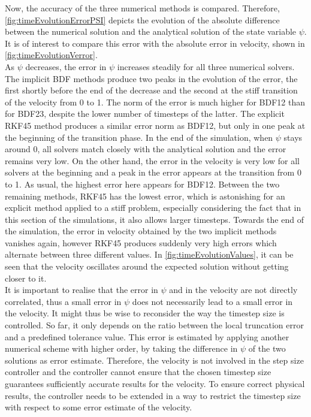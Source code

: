 \documentclass{report}
\begin{document}
Now, the accuracy of the three numerical methods is compared. Therefore, \autoref{fig:timeEvolutionErrorPSI} depicts the evolution of the absolute difference between the numerical solution and the analytical solution of the state variable $\psi$. It is of interest to compare this error with the absolute error in velocity, shown in \autoref{fig:timeEvolutionVerror}. \\ 
As $\psi$ decreases, the error in $\psi$ increases steadily for all three numerical solvers. The implicit BDF methods produce two peaks in the evolution of the error, the first shortly before the end of the decrease and the second at the stiff transition of the velocity from 0 to 1. The norm of the error is much higher for BDF12 than for BDF23, despite the lower number of timesteps of the latter. The explicit RKF45 method produces a similar error norm as BDF12, but only in one peak at the beginning of the transition phase. In the end of the simulation, when $\psi$ stays around 0, all solvers match closely with the analytical solution and the error remains very low. On the other hand, the error in the velocity is very low for all solvers at the beginning and a peak in the error appears at the transition from 0 to 1. As usual, the highest error here appears for BDF12. Between the two remaining methods, RKF45 has the lowest error, which is astonishing for an explicit method applied to a stiff problem, especially considering the fact that in this section of the simulations, it also allows larger timesteps. Towards the end of the simulation, the error in velocity obtained by the two implicit methods vanishes again, however RKF45 produces suddenly very high errors which alternate between three different values. In \autoref{fig:timeEvolutionValues}, it can be seen that the velocity oscillates around the expected solution without getting closer to it. \\
It is important to realise that the error in $\psi$ and in the velocity are not directly correlated, thus a small error in $\psi$ does not necessarily lead to a small error in the velocity. It might thus be wise to reconsider the way the timestep size is controlled. So far, it only depends on the ratio between the local truncation error and a predefined tolerance value. This error is estimated by applying another numerical scheme with higher order, by taking the difference in $\psi$ of the two solutions as error estimate. Therefore, the velocity is not involved in the step size controller and the controller cannot ensure that the chosen timestep size guarantees sufficiently accurate results for the velocity. To ensure correct physical results, the controller needs to be extended in a way to restrict the timestep size with respect to some error estimate of the velocity. 
\end{document}
